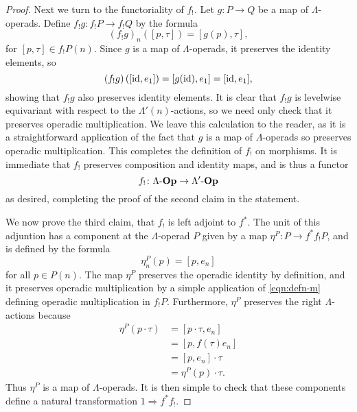 \begin{proof}
Next we turn to the functoriality of $f_{!}$. Let $g \colon P \to Q$ be a map of $\Lambda$-operads. Define $f_{!}g \colon f_{!}P \to f_{!}Q$ by the formula
\begin{equation}\label{eqn:fshriek-g}
(f_{!}g)_n\left( [p, \tau] \right) = [g(p), \tau],
\end{equation}
for $[p, \tau] \in f_{!}P(n)$.
Since $g$ is a map of $\Lambda$-operads, it preserves the identity elements, so
\[
(f_{!}g)\left( [\textrm{id}, e_1] \right) = [g(\textrm{id}), e_1] = [\textrm{id}, e_1],
\]
showing that $f_{!}g$ also preserves identity elements. It is clear that $f_{!}g$ is levelwise equivariant with respect to the $\Lambda'(n)$-actions, so we need only check that it preserves operadic multiplication. We leave this calculation to the reader, as it is a straightforward application of the fact that $g$ is a map of $\Lambda$-operads so preserves operadic multiplication. This completes the definition of $f_{!}$ on morphisms. It is immediate that $f_{!}$ preserves composition and identity maps, and is thus a functor 
\[ f_{!} \colon \Lambda\mbox{-}\mathbf{Op} \rightarrow \Lambda'\mbox{-}\mathbf{Op}\]
as desired, completing the proof of the second claim in the statement.

We now prove the third claim, that $f_{!}$ is left adjoint to $f^*$.
The unit of this adjuntion has a component at the $\Lambda$-operad $P$ given by a map $\eta^P \colon P \to f^*f_{!}P$, and is defined by the formula
\[
\eta^{P}_n(p) = [p, e_n]
\]
for all $p \in P(n)$. The map $\eta^P$ preserves the operadic identity by definition, and it preserves operadic multiplication by a simple application of \cref{eqn:defn-m} defining operadic multiplication in $f_{!}P$. Furthermore, $\eta^P$ preserves the right $\Lambda$-actions because
\begin{align*}
\eta^{P}(p\cdot \tau) & = [p \cdot \tau, e_n] \\
& = [p, f(\tau)e_n] \\
& = [p, e_n] \cdot \tau \\
& = \eta^P(p) \cdot \tau.
\end{align*}
Thus $\eta^P$ is a map of $\Lambda$-operads. It is then simple to check that these components define a natural transformation $1 \Rightarrow f^* f_{!}$.


\end{proof}

